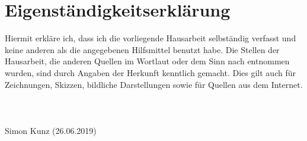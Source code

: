\documentclass[a4paper, 12pt]{article}
\begin{document}
\section{Eigenständigkeitserklärung}
Hiermit erkläre ich, dass ich die vorliegende Hausarbeit selbständig verfasst und keine anderen als die angegebenen Hilfsmittel benutzt habe.
Die Stellen der Hausarbeit, die anderen Quellen im Wortlaut oder dem Sinn nach entnommen wurden, sind durch Angaben der Herkunft kenntlich gemacht. Dies gilt auch für Zeichnungen, Skizzen, bildliche Darstellungen sowie für Quellen aus dem Internet.
\\\\\\\\

Simon Kunz (26.06.2019)

\newpage
\printbibliography
\end{document}
